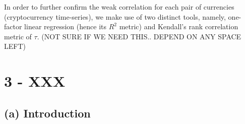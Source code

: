\documentclass[12pt,twoside]{article}
\begin{document}
\bigbreak
In order to further confirm the weak correlation for each pair of currencies (cryptocurrency time-series), we make use of two distinct tools, namely, one-factor linear regression (hence its $R^2$ metric) and Kendall’s rank correlation metric of $\tau$. (NOT SURE IF WE NEED THIS.. DEPEND ON ANY SPACE LEFT)
\section*{3 - XXX}
\subsection*{(a) Introduction}
\end{document}
